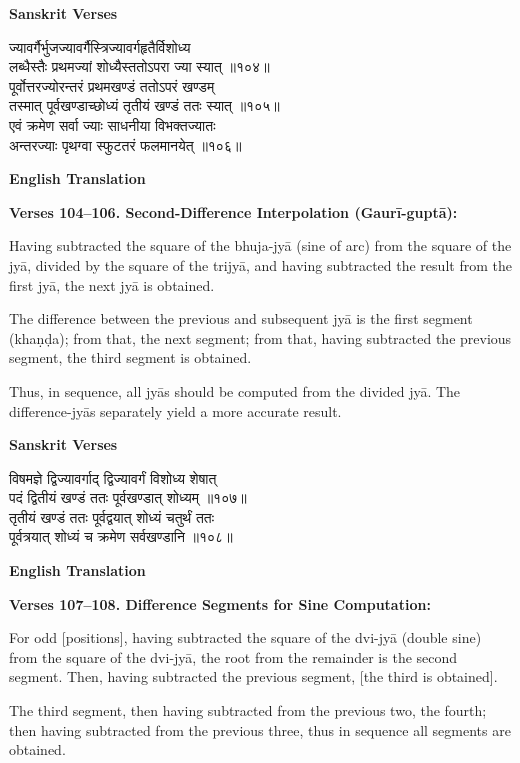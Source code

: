 \documentclass[11pt,a4paper]{article}
\begin{document}
\begin{minipage}[t]{0.48\textwidth}
\textbf{\small Sanskrit Verses}

\small\devanagarifont
ज्यावर्गैर्भुजज्यावर्गैस्त्रिज्यावर्गहृतैर्विशोध्य\\
लब्धैस्तैः प्रथमज्यां शोध्यैस्ततोऽपरा ज्या स्यात् ॥१०४॥\\[0.5em]
पूर्वोत्तरज्योरन्तरं प्रथमखण्डं ततोऽपरं खण्डम्\\
तस्मात् पूर्वखण्डाच्छोध्यं तृतीयं खण्डं ततः स्यात् ॥१०५॥\\[0.5em]
एवं क्रमेण सर्वा ज्याः साधनीया विभक्तज्यातः\\
अन्तरज्याः पृथग्वा स्फुटतरं फलमानयेत् ॥१०६॥
\end{minipage}%
\hfill
\begin{minipage}[t]{0.48\textwidth}
\textbf{\small English Translation}

\textbf{Verses 104--106. Second-Difference Interpolation (Gaur\=i-gupt\=a):}

Having subtracted the square of the bhuja-jy\=a (sine of arc) from the square of the jy\=a, divided by the square of the trijy\=a, and having subtracted the result from the first jy\=a, the next jy\=a is obtained.

The difference between the previous and subsequent jy\=a is the first segment (kha\d{n}\d{d}a); from that, the next segment; from that, having subtracted the previous segment, the third segment is obtained.

Thus, in sequence, all jy\=as should be computed from the divided jy\=a. The difference-jy\=as separately yield a more accurate result.
\end{minipage}

\vspace{0.5em}
\begin{minipage}[t]{0.48\textwidth}
\textbf{\small Sanskrit Verses}

\small\devanagarifont
विषमज्ञे द्विज्यावर्गाद् द्विज्यावर्गं विशोध्य शेषात्\\
पदं द्वितीयं खण्डं ततः पूर्वखण्डात् शोध्यम् ॥१०७॥\\[0.5em]
तृतीयं खण्डं ततः पूर्वद्वयात् शोध्यं चतुर्थं ततः\\
पूर्वत्रयात् शोध्यं च क्रमेण सर्वखण्डानि ॥१०८॥
\end{minipage}%
\hfill
\begin{minipage}[t]{0.48\textwidth}
\textbf{\small English Translation}

\textbf{Verses 107--108. Difference Segments for Sine Computation:}

For odd [positions], having subtracted the square of the dvi-jy\=a (double sine) from the square of the dvi-jy\=a, the root from the remainder is the second segment. Then, having subtracted the previous segment, [the third is obtained].

The third segment, then having subtracted from the previous two, the fourth; then having subtracted from the previous three, thus in sequence all segments are obtained.
\end{minipage}
\end{document}
